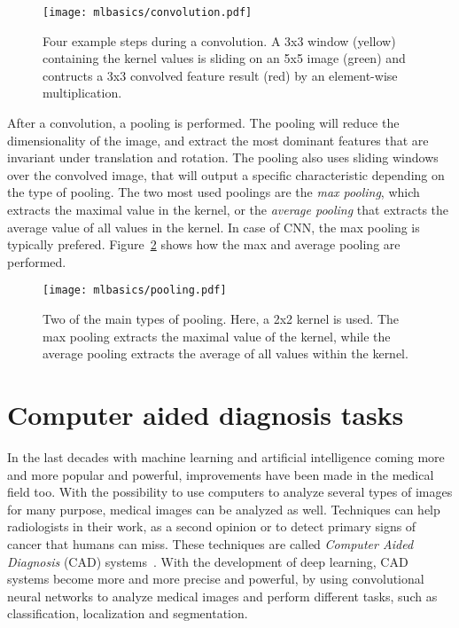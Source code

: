 \begin{figure}[t]
  \centering
  \texttt{[image: mlbasics/convolution.pdf]}
  \caption[Convolution steps example]{Four example steps during a convolution. A 3x3 window (yellow) containing the kernel values is sliding on an 5x5 image (green) and contructs a 3x3 convolved feature result (red) by an element-wise multiplication.}
  \label{fig:convolution}
\end{figure}

After a convolution, a pooling is performed. The pooling will reduce the dimensionality of the image, and extract the most dominant features that are invariant under translation and rotation. The pooling also uses sliding windows over the convolved image, that will output a specific characteristic depending on the type of pooling. The two most used poolings are the \emph{max pooling}, which extracts the maximal value in the kernel, or the \emph{average pooling} that extracts the average value of all values in the kernel. In case of CNN, the max pooling is typically prefered. Figure~\ref{fig:pooling} shows how the max and average pooling are performed.

\begin{figure}[t!]
  \centering
  \texttt{[image: mlbasics/pooling.pdf]}
  \caption[Two of the main types of pooling]{Two of the main types of pooling. Here, a 2x2 kernel is used. The max pooling extracts the maximal value of the kernel, while the average pooling extracts the average of all values within the kernel.}
  \label{fig:pooling}
\end{figure}


\section{Computer aided diagnosis tasks}
\label{sec:tasks}
In the last decades with machine learning and artificial intelligence coming more and more popular and powerful, improvements have been made in the medical field too. With the possibility to use computers to analyze several types of images for many purpose, medical images can be analyzed as well. Techniques can help radiologists in their work, as a second opinion or to detect primary signs of cancer that humans can miss. These techniques are called \emph{Computer Aided Diagnosis} (CAD) systems~\cite{doi_computer-aided_2007}. With the development of deep learning, CAD systems become more and more precise and powerful, by using convolutional neural networks to analyze medical images and perform different tasks, such as classification, localization and segmentation.

